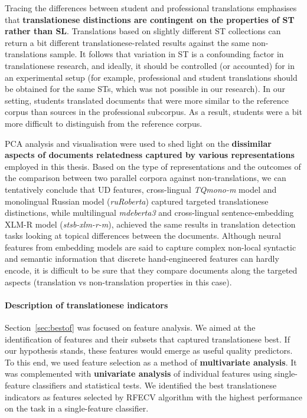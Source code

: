 Tracing the differences between student and professional translations emphasises that \textbf{translationese distinctions are contingent on the properties of ST rather than SL}. Translations based on slightly different ST collections can return a bit different translationese-related results against the same non-translations sample. It follows that variation in ST is a confounding factor in translationese research, and ideally, it should be controlled (or accounted) for in an experimental setup (for example, professional and student translations should be obtained for the same STs, which was not possible in our research). 
In our setting, students translated documents that were more similar to the reference corpus than sources in the professional subcorpus. As a result, students were a bit more difficult to distinguish from the reference corpus. 

PCA analysis and visualisation were used to shed light on the \textbf{dissimilar aspects of documents relatedness captured by various representations} employed in this thesis. 
Based on the type of representations and the outcomes of the comparison between two parallel corpora against non-translations, we can tentatively conclude that UD features, cross-lingual \textit{TQmono-m} model and monolingual Russian model (\textit{ruRoberta}) captured targeted translationese distinctions, while multilingual \textit{mdeberta3} and cross-lingual sentence-embedding XLM-R model (\textit{stsb-xlm-r-m}), achieved the same results in translation detection tasks looking at topical differences between the documents. Although neural features from embedding models are said to capture complex non-local syntactic and semantic information that discrete hand-engineered features can hardly encode, it is difficult to be sure that they compare documents along the targeted aspects (translation vs non-translation properties in this case).

\paragraph{Description of translationese indicators}
Section~\ref{sec:bestof} was focused on feature analysis. We aimed at the identification of features and their subsets that captured translationese best. If our hypothesis stands, these features would emerge as useful quality predictors.
To this end, we used feature selection as a method of \textbf{multivariate analysis}. It was complemented with \textbf{univariate analysis} of individual features using single-feature classifiers and statistical tests. We identified the best translationese indicators as features selected by RFECV algorithm with the highest performance on the task in a single-feature classifier. 

